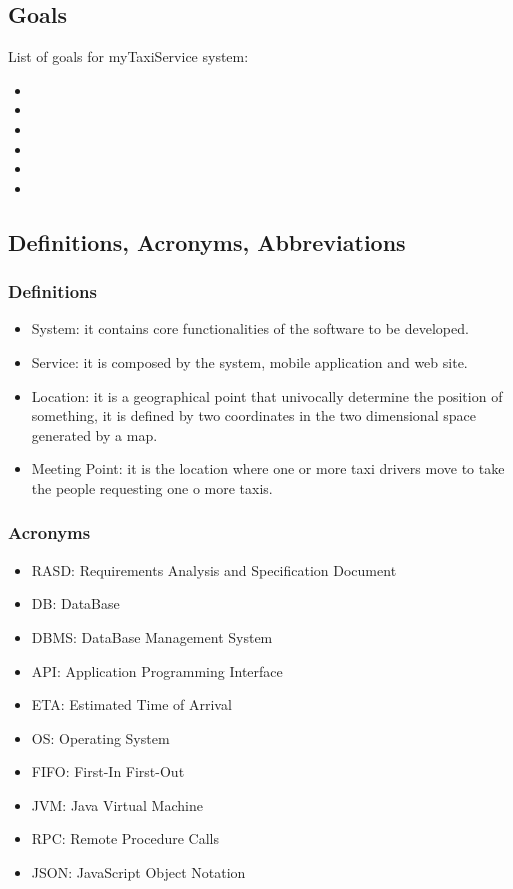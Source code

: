 \documentclass[a4paper,12pt,dvipsnames]{article}%
\begin{document}
\subsection{Goals}
List of goals for myTaxiService system:
\begin{itemize}
\item {}
\item {}
\item {}
\item {}
\item {}
\item {}
\end{itemize}
\subsection{Definitions, Acronyms, Abbreviations}
\subsubsection{Definitions}
\begin{itemize}
\item System: it contains core functionalities of the software to be developed.
\item Service: it is composed by the system, mobile application and web site.
\item Location: it is a geographical point that univocally determine the position of something, it is defined by two coordinates in the two dimensional space generated by a map.
\item Meeting Point: it is the location where one or more taxi drivers move to take the people requesting one o more taxis.
\end{itemize}
\subsubsection{Acronyms}
\begin{itemize}
\item RASD: Requirements Analysis and Specification Document
\item DB: DataBase
\item DBMS: DataBase Management System
\item API: Application Programming Interface
\item ETA: Estimated Time of Arrival
\item OS: Operating System
\item FIFO: First-In First-Out
\item JVM: Java Virtual Machine
\item RPC: Remote Procedure Calls
\item JSON: JavaScript Object Notation
\end{itemize}
\end{document}
